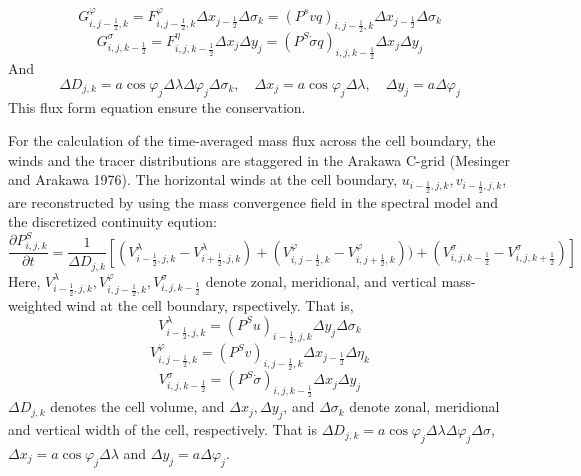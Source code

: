 \begin{equation}
  G^{\varphi}_{i,j-\frac{1}{2},k}=F^{\varphi}_{i,j-\frac{1}{2},k} \Delta x_{j-\frac{1}{2}} \Delta \sigma_{k}=(P^{s}vq)_{i,j-\frac{1}{2},k} \Delta x_{j-\frac{1}{2}} \Delta \sigma_{k}
\end{equation}
\begin{equation}
  G^{\sigma}_{i,j,k-\frac{1}{2}}=F^{\eta}_{i,j,k-\frac{1}{2}} \Delta x_{j} \Delta y_{j}=(P^{S} \dot{\sigma} q)_{i,j,k-\frac{1}{2}} \Delta x_{j} \Delta y_{j}
\end{equation}
And
\begin{equation}
  \Delta D_{j,k}=a \cos \varphi_{j} \Delta \lambda \Delta \varphi_{j} \Delta \sigma_{k},\quad \Delta x_{j}=a \cos \varphi_{j} \Delta \lambda,\quad \Delta y_{j}=a \Delta \varphi_{j}
\end{equation}
This flux form equation ensure the conservation.

For the calculation of the time-averaged mass flux across the cell boundary, the winds and the tracer distributions are staggered in the Arakawa C-grid (Mesinger and Arakawa 1976). The horizontal winds at the cell boundary, $u_{i-\frac{1}{2},j,k}, v_{i-\frac{1}{2},j,k}$, are reconstructed by using the mass convergence field in the spectral model and the discretized continuity eqution:
\begin{equation}
  \frac{\partial P^{S}_{i,j,k} }{\partial t}=\frac{1}{\Delta D_{j,k}}[(V^{\lambda}_{i-\frac{1}{2},j,k}-V^{\lambda}_{i+\frac{1}{2},j,k})+(V^{\varphi}_{i,j-\frac{1}{2},k}-V^{\varphi}_{i,j+\frac{1}{2},k}))+(V^{\sigma}_{i,j,k-\frac{1}{2}}-V^{\sigma}_{i,j,k+\frac{1}{2}})]
\end{equation}
Here, $V^{\lambda}_{i-\frac{1}{2},j,k}, V^{\varphi}_{i,j-\frac{1}{2},k}, V^{\sigma}_{i,j,k-\frac{1}{2}}$ denote zonal, meridional, and vertical mass-weighted wind at the cell boundary, rspectively. That is,
\begin{equation}
  V^{\lambda}_{i-\frac{1}{2},j,k}=(P^{S}u)_{i-\frac{1}{2},j,k} \Delta y_{j} \Delta \sigma_{k}
\end{equation}
\begin{equation}
  V^{\varphi}_{i,j-\frac{1}{2},k}=(P^{S}v)_{i,j-\frac{1}{2},k} \Delta x_{j-\frac{1}{2}} \Delta \eta_{k}
\end{equation}
\begin{equation}
  V^{\sigma}_{i,j,k-\frac{1}{2}}=(P^{S}\dot{\sigma})_{i,j,k-\frac{1}{2}} \Delta x_{j} \Delta y_{j}
\end{equation}
$\Delta D_{j,k}$ denotes the cell volume, and $\Delta x_{j}, \Delta y_{j}$, and $\Delta \sigma_{k}$ denote zonal, meridional and vertical width of the cell, respectively. That is $\Delta D_{j,k}=a \cos \varphi_{j}\Delta \lambda \Delta \varphi_{j} \Delta \sigma$, $\Delta x_{j}=a \cos \varphi_{j} \Delta \lambda$ and $\Delta y_{j}=a \Delta \varphi_{j}$.

